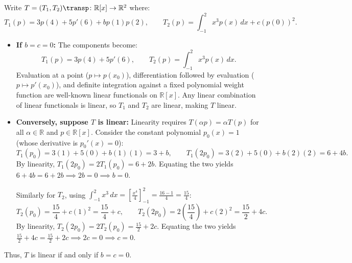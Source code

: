 \begin{exercisesolution}
\label{sol:polynomial_integral_eval_linear_map}
Write $T = (T_1, T_2)\transp \colon \mathbb{R}[x] \to \mathbb{R}^2$ where:
\[
T_1(p) = 3p(4) + 5p'(6) + b p(1)p(2), \qquad T_2(p) = \int_{-1}^2 x^3 p(x) \, dx + c (p(0))^2.
\]
\begin{itemize}
    \item \textbf{If $b = c = 0$:} The components become:
    \[
    T_1(p) = 3p(4) + 5p'(6), \qquad T_2(p) = \int_{-1}^2 x^3 p(x) \, dx.
    \]
    Evaluation at a point ($p \mapsto p(x_0)$), differentiation followed by evaluation ($p \mapsto p'(x_0)$), and definite integration against a fixed polynomial weight function are well-known linear functionals on $\mathbb{R}[x]$. Any linear combination of linear functionals is linear, so $T_1$ and $T_2$ are linear, making $T$ linear.

    \item \textbf{Conversely, suppose $T$ is linear:}
    Linearity requires $T(\alpha p) = \alpha T(p)$ for all $\alpha \in \mathbb{R}$ and $p \in \mathbb{R}[x]$.
    Consider the constant polynomial $p_0(x) = 1$ (whose derivative is $p_0'(x) = 0$):
    \[
    T_1(p_0) = 3(1) + 5(0) + b(1)(1) = 3 + b, \qquad T_1(2 p_0) = 3(2) + 5(0) + b(2)(2) = 6 + 4b.
    \]
    By linearity, $T_1(2 p_0) = 2 T_1(p_0) = 6 + 2b$. Equating the two yields $6 + 4b = 6 + 2b \implies 2b = 0 \implies b = 0$.

    Similarly for $T_2$, using $\int_{-1}^2 x^3 \, dx = \left[\frac{x^4}{4}\right]_{-1}^2 = \frac{16 - 1}{4} = \frac{15}{4}$:
    \[
    T_2(p_0) = \frac{15}{4} + c(1)^2 = \frac{15}{4} + c, \qquad T_2(2 p_0) = 2\left(\frac{15}{4}\right) + c(2)^2 = \frac{15}{2} + 4c.
    \]
    By linearity, $T_2(2 p_0) = 2 T_2(p_0) = \frac{15}{2} + 2c$. Equating the two yields $\frac{15}{2} + 4c = \frac{15}{2} + 2c \implies 2c = 0 \implies c = 0$.
\end{itemize}
Thus, $T$ is linear if and only if $b = c = 0$.
\end{exercisesolution}

